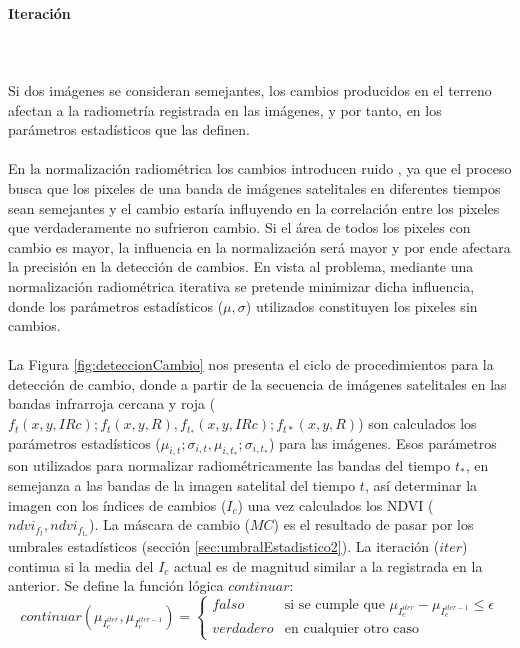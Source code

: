 \paragraph{Iteraci\'on}\label{subsec:iteracion}\mbox{}\\\mbox{}\\
 Si dos im\'agenes se consideran semejantes, los cambios producidos en el terreno afectan a la radiometr\'ia registrada en las im\'agenes, y por tanto, en los par\'ametros estad\'isticos que las definen.\\~\\
En la normalizaci\'on radiom\'etrica los cambios introducen ruido \cite{martinez2013normalizacion}, ya que el proceso busca que los pixeles de una banda de im\'agenes satelitales en diferentes tiempos sean semejantes y el cambio estar\'ia influyendo en la correlaci\'on entre los pixeles que verdaderamente no sufrieron cambio. Si el \'area de todos los pixeles con cambio es mayor, la influencia en la normalizaci\'on ser\'a mayor y por ende afectara la precisi\'on en la detecci\'on de cambios. En vista al problema, mediante una normalizaci\'on radiom\'etrica iterativa se pretende minimizar dicha influencia, donde los par\'ametros estad\'isticos ($ \mu,\sigma $) utilizados constituyen los pixeles sin cambios.\\~\\	
La Figura \ref{fig:deteccionCambio} nos presenta el ciclo de procedimientos para la detecci\'on de cambio, donde a partir de la secuencia de im\'agenes satelitales en las bandas infrarroja cercana y roja ($ f_{t}(x,y,IRc);f_{t}(x,y,R), f_{t_{*}}(x,y,IRc);f_{t*}(x,y,R) $) son calculados los par\'ametros estad\'isticos ($ \mu_{i,t};\sigma_{i,t}, \mu_{i,t_{*}};\sigma_{i,t_{*}} $) para las im\'agenes. Esos par\'ametros son utilizados para normalizar radiom\'etricamente las bandas del tiempo $ t_{*} $, en semejanza a las bandas de la imagen satelital del tiempo $ t $, as\'i determinar la imagen con los \'indices de cambios ($ I_{c} $) una vez calculados los NDVI ($ ndvi_{f_{t}},ndvi_{f_{t_{*}}} $). La m\'ascara de cambio ($ MC $) es el resultado de pasar por los umbrales estad\'isticos (secci\'on \ref{sec:umbralEstadistico2}). La iteraci\'on ($ iter $) continua si la media del $ I_{c} $ actual es de magnitud similar a la registrada en la anterior. Se define la función l\'ogica $ continuar $:
  \begin{equation}\label{ec:continuar}
  continuar(\mu_{I_{c}^{iter}},\mu_{I_{c}^{iter-1}}) = \begin{cases}
  falso & \text{si se cumple que } \mu_{I_{c}^{iter}} - \mu_{I_{c}^{iter-1}} \leq \epsilon \\
  verdadero & \text{en cualquier otro caso }
  \end{cases}
  \end{equation}
